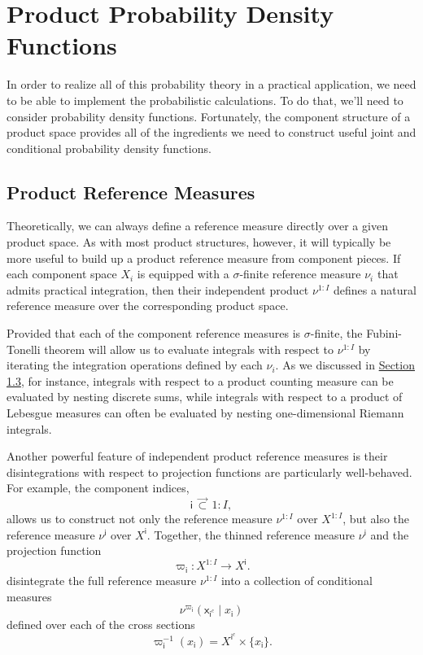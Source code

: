 \documentclass[
  letterpaper,
  DIV=11,
  numbers=noendperiod]{scrartcl}
\begin{document}
\section{Product Probability Density
Functions}\label{product-probability-density-functions}

In order to realize all of this probability theory in a practical
application, we need to be able to implement the probabilistic
calculations. To do that, we'll need to consider probability density
functions. Fortunately, the component structure of a product space
provides all of the ingredients we need to construct useful joint and
conditional probability density functions.

\subsection{Product Reference
Measures}\label{product-reference-measures}

Theoretically, we can always define a reference measure directly over a
given product space. As with most product structures, however, it will
typically be more useful to build up a product reference measure from
component pieces. If each component space \(X_{i}\) is equipped with a
\(\sigma\)-finite reference measure \(\nu_{i}\) that admits practical
integration, then their independent product \(\nu^{1:I}\) defines a
natural reference measure over the corresponding product space.

Provided that each of the component reference measures is
\(\sigma\)-finite, the Fubini-Tonelli theorem will allow us to evaluate
integrals with respect to \(\nu^{1:I}\) by iterating the integration
operations defined by each \(\nu_{i}\). As we discussed in
\hyperref[sec:fubini]{Section 1.3}, for instance, integrals with respect
to a product counting measure can be evaluated by nesting discrete sums,
while integrals with respect to a product of Lebesgue measures can often
be evaluated by nesting one-dimensional Riemann integrals.

Another powerful feature of independent product reference measures is
their disintegrations with respect to projection functions are
particularly well-behaved. For example, the component indices, \[
\mathsf{i} \, \vec{\subset} \, 1:I,
\] allows us to construct not only the reference measure \(\nu^{1:I}\)
over \(X^{1:I}\), but also the reference measure \(\nu^{ \mathsf{i} }\)
over \(X^{ \mathsf{i} }\). Together, the thinned reference measure
\(\nu^{ \mathsf{i} }\) and the projection function \[
\varpi_{\mathsf{i}} : X^{1:I} \rightarrow X^{\mathsf{i}}.
\] disintegrate the full reference measure \(\nu^{1:I}\) into a
collection of conditional measures \[
\nu^{\varpi_{\mathsf{i}}}(
  \mathsf{x}_{\mathsf{i}^{c}} \mid x_{ \mathsf{i} }
)
\] defined over each of the cross sections \[
\varpi_{\mathsf{i}}^{-1}( x_{\mathsf{i}} )
=
X^{\mathsf{i}^{c}} \times \{ x_{\mathsf{i}} \}.
\]
\end{document}
